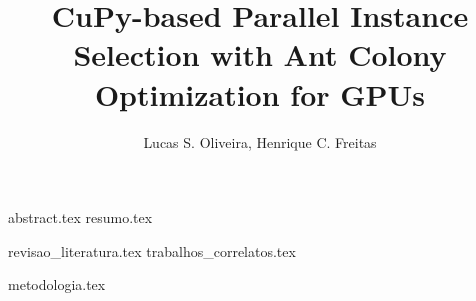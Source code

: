 \documentclass{article}
\title{CuPy-based Parallel Instance Selection with Ant Colony Optimization for GPUs}
\author{{Lucas S. Oliveira\inst{1}, Henrique C. Freitas\inst{1}}}
\begin{document}
 

\maketitle

{abstract.tex}
{resumo.tex}

{revisao_literatura.tex}
{trabalhos_correlatos.tex}

{metodologia.tex}

\printbibliography
\end{document}
